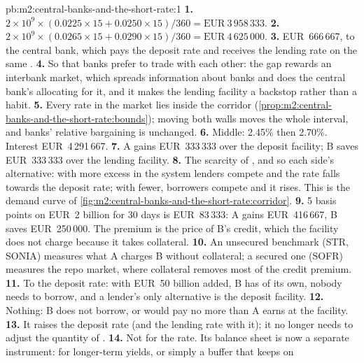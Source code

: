 \begin{solution}{pb:m2:central-banks-and-the-short-rate:1}
\textbf{1.} $2 \times 10^9 \times (0.0225 \times 15 + 0.0250 \times 15)/360 =
\text{EUR}~3\,958\,333$.
\textbf{2.} $2 \times 10^9 \times (0.0265 \times 15 + 0.0290 \times 15)/360 =
\text{EUR}~4\,625\,000$.
\textbf{3.} EUR~666\,667, to the central bank, which pays the deposit rate
and receives the lending rate on the same .
\textbf{4.} So that banks prefer to trade with each other: the gap rewards an
interbank market, which spreads information about banks and does the
central bank's allocating for it, and it makes the lending facility a
backstop rather than a habit.
\textbf{5.} Every rate in the market lies inside the corridor
(\cref{prop:m2:central-banks-and-the-short-rate:bounds}); moving both walls
moves the whole interval, and banks' relative bargaining is unchanged.
\textbf{6.} Middle: 2.45\% then 2.70\%. Interest EUR~4\,291\,667.
\textbf{7.} A gains EUR~333\,333 over the deposit facility; B saves
EUR~333\,333 over the lending facility.
\textbf{8.} The scarcity of , and so each side's alternative:
with more excess  in the system lenders compete and the rate falls
towards the deposit rate; with fewer, borrowers compete and it rises. This is
the demand curve of \cref{fig:m2:central-banks-and-the-short-rate:corridor}.
\textbf{9.} 5 basis points on EUR~2 billion for 30 days is EUR~83\,333: A
gains EUR~416\,667, B saves EUR~250\,000. The premium is the price of B's
credit, which the facility does not charge because it takes collateral.
\textbf{10.} An unsecured benchmark (\texteuro STR, SONIA) measures what A
charges B without collateral; a secured one (SOFR) measures the repo market,
where collateral removes most of the credit premium.
\textbf{11.} To the deposit rate: with EUR~50 billion added, B has 
of its own, nobody needs to borrow, and a lender's only alternative is the
deposit facility.
\textbf{12.} Nothing: B does not borrow, or would pay no more than A earns at
the facility.
\textbf{13.} It raises the deposit rate (and the lending rate with it); it no
longer needs to adjust the quantity of .
\textbf{14.} Not for the rate. Its balance sheet is now a separate
instrument: for longer-term yields, or simply a buffer that keeps  on

\end{solution}
